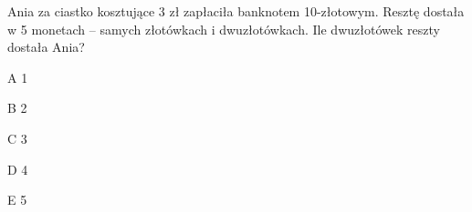 \begin{tresc}
Ania za ciastko kosztujące 3 zł zapłaciła banknotem 10-złotowym. Resztę dostała w 5 monetach – samych złotówkach i dwuzłotówkach. Ile dwuzłotówek reszty dostała Ania?
\end{tresc}
\begin{wariant}{A} 1 \end{wariant}
\begin{wariant}{B} 2 \end{wariant}
\begin{wariant}{C} 3 \end{wariant}
\begin{wariant}{D} 4 \end{wariant}
\begin{wariant}{E} 5 \end{wariant}
